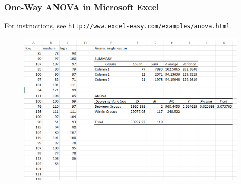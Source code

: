 \documentclass[xcolor=dvipsnames]{beamer}
\begin{document}
\begin{frame}
  \frametitle{One-Way ANOVA in Microsoft Excel}
For instructions, see {\tiny \texttt{http://www.excel-easy.com/examples/anova.html}}.
  \begin{figure}[h]
    \includegraphics[scale=0.5]{./diagrams/lead-with-anova.png}
  \end{figure}
\end{frame}
\end{document}
